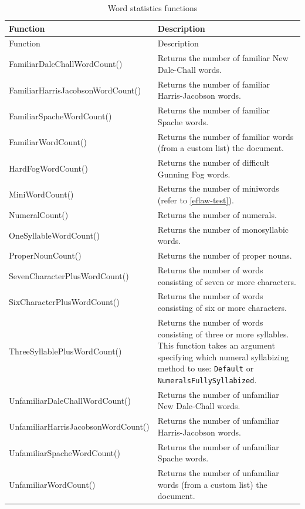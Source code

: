 \documentclass[
]{book}
\theoremstyle{definition}
\theoremstyle{definition}
\theoremstyle{definition}
\theoremstyle{definition}
\theoremstyle{remark}
\begin{document}
\begin{longtable}[]{@{}
  >{\raggedright\arraybackslash}p{}
  >{\raggedright\arraybackslash}p{}@{}}
\caption{Word statistics functions}\tabularnewline
\toprule
Function & Description \\
\midrule
\endfirsthead
\toprule
Function & Description \\
\midrule
\endhead
FamiliarDaleChallWordCount() & Returns the number of familiar New Dale-Chall words. \\
FamiliarHarrisJacobsonWordCount() & Returns the number of familiar Harris-Jacobson words. \\
FamiliarSpacheWordCount() & Returns the number of familiar Spache words. \\
FamiliarWordCount() & Returns the number of familiar words (from a custom list) the document. \\
HardFogWordCount() & Returns the number of difficult Gunning Fog words. \\
MiniWordCount() & Returns the number of miniwords (refer to \ref{eflaw-test}). \\
NumeralCount() & Returns the number of numerals. \\
OneSyllableWordCount() & Returns the number of monosyllabic words. \\
ProperNounCount() & Returns the number of proper nouns. \\
SevenCharacterPlusWordCount() & Returns the number of words consisting of seven or more characters. \\
SixCharacterPlusWordCount() & Returns the number of words consisting of six or more characters. \\
ThreeSyllablePlusWordCount() & Returns the number of words consisting of three or more syllables. This function takes an argument specifying which numeral syllabizing method to use: \texttt{Default} or \texttt{NumeralsFullySyllabized}. \\
UnfamiliarDaleChallWordCount() & Returns the number of unfamiliar New Dale-Chall words. \\
UnfamiliarHarrisJacobsonWordCount() & Returns the number of unfamiliar Harris-Jacobson words. \\
UnfamiliarSpacheWordCount() & Returns the number of unfamiliar Spache words. \\
UnfamiliarWordCount() & Returns the number of unfamiliar words (from a custom list) the document. \\

\end{longtable}
\end{document}
